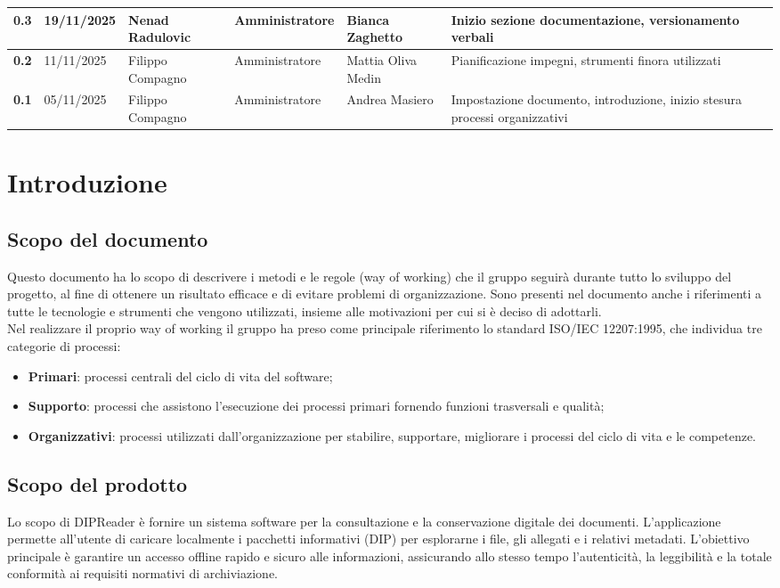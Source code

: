 \documentclass[a4paper,12pt]{article}
\begin{document}
\begin{xltabular}{\textwidth}{|l|l|X|l|X|X|}
        \hline
        \textbf{0.3} & 19/11/2025 & Nenad Radulovic & Amministratore & Bianca Zaghetto & Inizio sezione documentazione, versionamento verbali \\
        \hline
        \textbf{0.2} & 11/11/2025 & Filippo Compagno & Amministratore & Mattia Oliva Medin & Pianificazione impegni, strumenti finora utilizzati \\
        \hline
        \textbf{0.1} & 05/11/2025 & Filippo Compagno & Amministratore & Andrea Masiero & Impostazione documento, introduzione, inizio stesura processi organizzativi \\
    \end{xltabular}

\newpage

\tableofcontents
\newpage

\section{Introduzione}
    \subsection{Scopo del documento}
        Questo documento ha lo scopo di descrivere i metodi e le regole (way of working) che il gruppo seguirà durante tutto lo sviluppo del progetto, al fine di ottenere un risultato efficace e di evitare problemi di organizzazione.
        Sono presenti nel documento anche i riferimenti a tutte le tecnologie e strumenti che vengono utilizzati, insieme alle motivazioni per cui si è deciso di adottarli.\\
        Nel realizzare il proprio way of working il gruppo ha preso come principale riferimento lo standard ISO/IEC 12207:1995, che individua tre categorie di processi:
        \begin{itemize}
            \item \textbf{Primari}: processi centrali del ciclo di vita del software;
            \item \textbf{Supporto}: processi che assistono l'esecuzione dei processi primari fornendo funzioni trasversali e qualità;
            \item \textbf{Organizzativi}: processi utilizzati dall'organizzazione per stabilire, supportare, migliorare i processi del ciclo di vita e le competenze.
        \end{itemize}

    \subsection{Scopo del prodotto}
        Lo scopo di DIPReader è fornire un sistema software per la consultazione e la conservazione digitale dei documenti. L'applicazione permette all'utente di caricare localmente i pacchetti informativi (DIP) per esplorarne i file, gli allegati e i relativi metadati. L'obiettivo principale è garantire un accesso offline rapido e sicuro alle informazioni, assicurando allo stesso tempo l'autenticità, la leggibilità e la totale conformità ai requisiti normativi di archiviazione.
\end{document}
